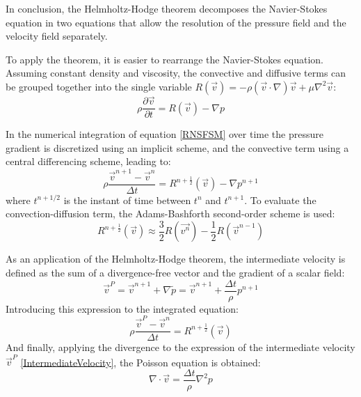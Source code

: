 In conclusion, the Helmholtz-Hodge theorem decomposes the Navier-Stokes equation in two equations that allow the resolution of the pressure field and the velocity field separately.

To apply the theorem, it is easier to rearrange the Navier-Stokes equation. Assuming constant density and viscosity, the convective and diffusive terms can be grouped together into the single variable $R\left(\vec{v}\right)=-\rho\left(\vec{v}\cdot\nabla\right)\vec{v}+\mu\nabla^{2}\vec{v}$:
\begin{equation}
\rho\frac{\partial\vec{v}}{\partial t}=R\left(\vec{v}\right)-\nabla p
\label{RNSFSM}
\end{equation}

In the numerical integration of equation \ref{RNSFSM} over time the pressure gradient is discretized using an implicit scheme, and the convective term using a central differencing scheme, leading to:
\begin{equation}
\rho\frac{\vec{v}^{n+1}-\vec{v}^{n}}{\Delta t}=R^{n+\frac{1}{2}}\left(\vec{v}\right)-\nabla p^{n+1}
\end{equation}
where $t^{n+1/2}$ is the instant of time between $t^{n}$ and $t^{n+1}$. To evaluate the convection-diffusion term, the Adams-Bashforth second-order scheme is used:
\begin{equation}
R^{n+\frac{1}{2}}\left(\vec{v}\right)\approx\frac{3}{2}R\left(\vec{v^{n}}\right)-\frac{1}{2}R\left(\vec{v}^{n-1}\right)
\label{AdamsBashforth}
\end{equation}

As an application of the Helmholtz-Hodge theorem, the intermediate velocity is defined as the sum of a divergence-free vector and the gradient of a scalar field:
\begin{equation}
\vec{v}^{P}=\vec{v}^{n+1}+\nabla\tilde{p}=\vec{v}^{n+1}+\frac{\Delta t}{\rho}p^{n+1}
\label{IntermediateVelocity}
\end{equation}
Introducing this expression to the integrated equation:
\begin{equation}
\rho\frac{\vec{v}^{P}-\vec{v}^{n}}{\Delta t}=R^{n+\frac{1}{2}}\left(\vec{v}\right)
\label{IntermediatewithR}
\end{equation}
And finally, applying the divergence to the expression of the intermediate velocity $\vec{v}^{P}$ \ref{IntermediateVelocity}, the Poisson equation is obtained:
\begin{equation}
\nabla\cdot\vec{v}=\frac{\Delta t}{\rho}\nabla^{2}p
\label{Poisson}
\end{equation}

